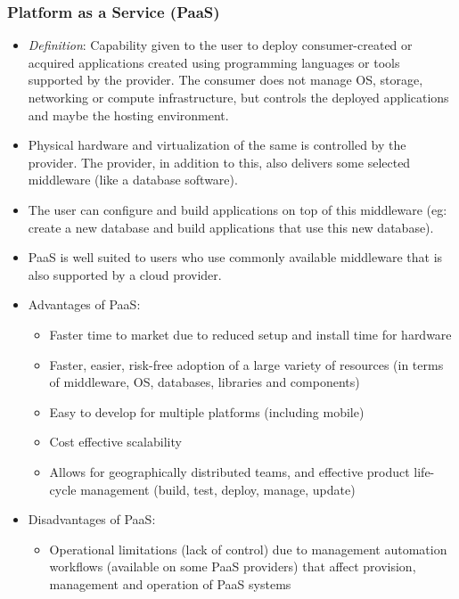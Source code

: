 \documentclass{article}
\begin{document}
\subsubsection{Platform as a Service (PaaS)}
\begin{itemize}
    \item \textit{Definition}: Capability given to the user to deploy consumer-created or acquired applications created using programming languages or tools supported by the provider. The consumer does not manage OS, storage, networking or compute infrastructure, but controls the deployed applications and maybe the hosting environment. 
    
    \item Physical hardware and virtualization of the same is controlled by the provider. The provider, in addition to this, also delivers some selected middleware (like a database software). 
    
    \item The user can configure and build applications on top of this middleware (eg: create a new database and build applications that use this new database). 
    
    \item PaaS is well suited to users who use commonly available middleware that is also supported by a cloud provider. 
    
    \item Advantages of PaaS:
    \begin{itemize}
        \item Faster time to market due to reduced setup and install time for hardware
        
        \item Faster, easier, risk-free adoption of a large variety of resources (in terms of middleware, OS, databases, libraries and components)
        
        \item Easy to develop for multiple platforms (including mobile)
        
        \item Cost effective scalability
        
        \item Allows for geographically distributed teams, and effective product life-cycle management (build, test, deploy, manage, update)
    \end{itemize}
    
    \item Disadvantages of PaaS:
    \begin{itemize}
        \item Operational limitations (lack of control) due to management automation workflows (available on some PaaS providers) that affect provision, management and operation of PaaS systems
        

\end{itemize}
\end{itemize}
\end{document}
